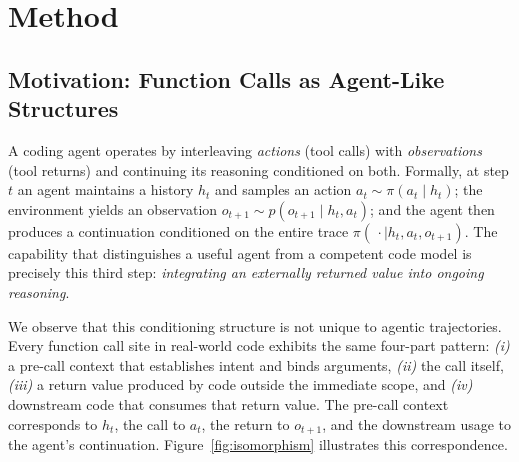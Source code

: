 %
%

\section{Method}
\label{sec:method}

\subsection{Motivation: Function Calls as Agent-Like Structures}
\label{sec:method:motivation}

A coding agent operates by interleaving \emph{actions} (tool calls) with
\emph{observations} (tool returns) and continuing its reasoning conditioned on
both. Formally, at step $t$ an agent maintains a history $h_t$ and samples an
action $a_t \sim \pi(a_t \mid h_t)$; the environment yields an observation
$o_{t+1} \sim p(o_{t+1} \mid h_t, a_t)$; and the agent then produces a
continuation conditioned on the entire trace
$\pi(\,\cdot \mid h_t, a_t, o_{t+1})$. The capability that distinguishes a
useful agent from a competent code model is precisely this third step:
\emph{integrating an externally returned value into ongoing reasoning}.

We observe that this conditioning structure is not unique to agentic
trajectories. Every function call site in real-world code exhibits the same
four-part pattern:
\textit{(i)} a pre-call context that establishes intent and binds arguments,
\textit{(ii)} the call itself,
\textit{(iii)} a return value produced by code outside the immediate scope,
and \textit{(iv)} downstream code that consumes that return value. The pre-call
context corresponds to $h_t$, the call to $a_t$, the return to $o_{t+1}$, and
the downstream usage to the agent's continuation. Figure~\ref{fig:isomorphism}
illustrates this correspondence.

